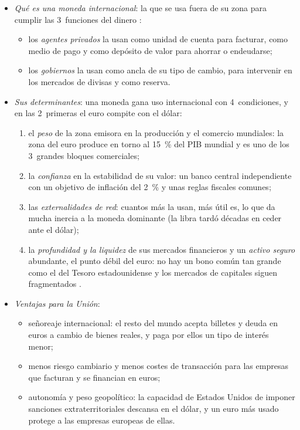\documentclass[11pt]{article}
\begin{document}
\begin{itemize}
\item \emph{Qué es una moneda internacional}: la que se usa fuera de su zona para cumplir las 3~funciones del dinero :
  \begin{itemize}
  \item los \emph{agentes privados} la usan como unidad de cuenta para facturar, como medio de pago y como depósito de valor para ahorrar o endeudarse;
  \item los \emph{gobiernos} la usan como ancla de su tipo de cambio, para intervenir en los mercados de divisas y como reserva.
  \end{itemize}
\item \emph{Sus determinantes}: una moneda gana uso internacional con 4~condiciones, y en las 2~primeras el euro compite con el dólar:
  \begin{enumerate}
  \item el \emph{peso} de la zona emisora en la producción y el comercio mundiales: la zona del euro produce en torno al 15~\% del PIB mundial y es uno de los 3~grandes bloques comerciales;
  \item la \emph{confianza} en la estabilidad de su valor: un banco central independiente con un objetivo de inflación del 2~\% y unas reglas fiscales comunes;
  \item las \emph{externalidades de red}: cuantos más la usan, más útil es, lo que da mucha inercia a la moneda dominante (la libra tardó décadas en ceder ante el dólar);
  \item la \emph{profundidad y la liquidez} de sus mercados financieros y un \emph{activo seguro} abundante, el punto débil del euro: no hay un bono común tan grande como el del Tesoro estadounidense y los mercados de capitales siguen fragmentados .
  \end{enumerate}
\item \emph{Ventajas para la Unión}:
  \begin{itemize}
  \item señoreaje internacional: el resto del mundo acepta billetes y deuda en euros a cambio de bienes reales, y paga por ellos un tipo de interés menor;
  \item menos riesgo cambiario y menos costes de transacción para las empresas que facturan y se financian en euros;
  \item autonomía y peso geopolítico: la capacidad de Estados Unidos de imponer sanciones extraterritoriales descansa en el dólar, y un euro más usado protege a las empresas europeas de ellas.

\end{itemize}
\end{itemize}
\end{document}
